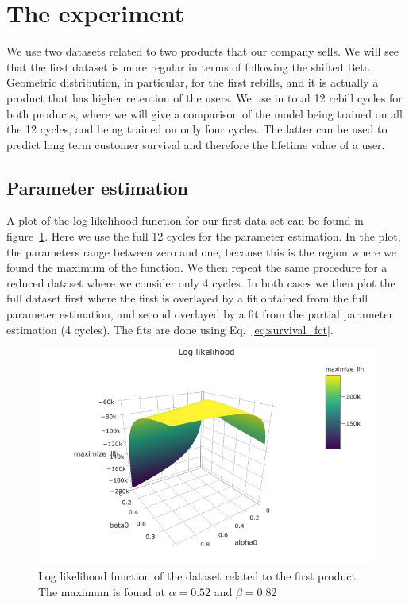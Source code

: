 \documentclass[paper=a4, fontsize=11pt]{scrartcl} %
\numberwithin{equation}{section} %
\numberwithin{figure}{section} %
\numberwithin{table}{section} %
\begin{document}
\newpage
\section{The experiment}
We use two datasets related to two products that our company sells. We will see that the first dataset is more regular in terms of following the shifted Beta Geometric distribution, in particular, for the first rebills, and it is actually a product that has higher retention of the users. We use in total 12 rebill cycles for both products, where we will give a comparison of the model being trained on all the 12 cycles, and being trained on only four cycles. The latter can be used to predict long term customer survival and therefore the lifetime value of a user.

\subsection{Parameter estimation}
A plot of the log likelihood function for our first data set can be found in figure~\ref{fig:loglikelihood}. Here we use the full 12 cycles for the parameter estimation. In the plot, the parameters range between zero and one, because this is the region where we found the maximum of the function. We then repeat the same procedure for a reduced dataset where we consider only 4 cycles. In both cases we then plot the full dataset first where the first is overlayed by a fit obtained from the full parameter estimation, and second overlayed by a fit from the partial parameter estimation (4 cycles). The fits are done using Eq.~\ref{eq:survival_fct}. 

\begin{figure}[h!]
	\centering
	\includegraphics[width=1\textwidth]{./figures/loglikelihood.png}
	\caption{Log likelihood function of the dataset related to the first product. The maximum is found at $\alpha = 0.52$ and $\beta = 0.82$}
	\label{fig:loglikelihood}
\end{figure}
\end{document}
